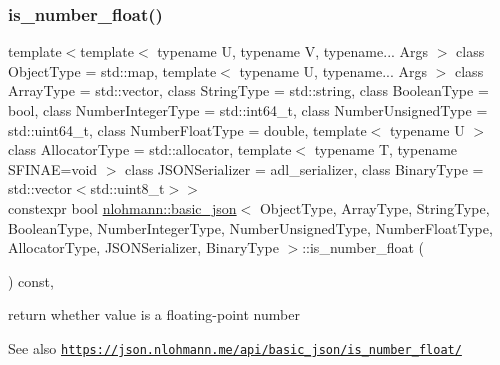 \subsubsection{\texorpdfstring{is\+\_\+number\+\_\+float()}{is\_number\_float()}}
{\footnotesize\ttfamily template$<$template$<$ typename U, typename V, typename... Args $>$ class Object\+Type = std\+::map, template$<$ typename U, typename... Args $>$ class Array\+Type = std\+::vector, class String\+Type  = std\+::string, class Boolean\+Type  = bool, class Number\+Integer\+Type  = std\+::int64\+\_\+t, class Number\+Unsigned\+Type  = std\+::uint64\+\_\+t, class Number\+Float\+Type  = double, template$<$ typename U $>$ class Allocator\+Type = std\+::allocator, template$<$ typename T, typename S\+F\+I\+N\+A\+E=void $>$ class J\+S\+O\+N\+Serializer = adl\+\_\+serializer, class Binary\+Type  = std\+::vector$<$std\+::uint8\+\_\+t$>$$>$ \\
constexpr bool \hyperlink{classnlohmann_1_1basic__json}{nlohmann\+::basic\+\_\+json}$<$ Object\+Type, Array\+Type, String\+Type, Boolean\+Type, Number\+Integer\+Type, Number\+Unsigned\+Type, Number\+Float\+Type, Allocator\+Type, J\+S\+O\+N\+Serializer, Binary\+Type $>$\+::is\+\_\+number\+\_\+float (\begin{DoxyParamCaption}{ }\end{DoxyParamCaption}) const\hspace{0.3cm}{\ttfamily [inline]}, {\ttfamily [noexcept]}}



return whether value is a floating-\/point number 

\begin{DoxySeeAlso}{See also}
\href{https://json.nlohmann.me/api/basic_json/is_number_float/}{\tt https\+://json.\+nlohmann.\+me/api/basic\+\_\+json/is\+\_\+number\+\_\+float/} 
\end{DoxySeeAlso}
\mbox{\label{classnlohmann_1_1basic__json_ac4b4acf2c0ad075c0dc125a65c102362}} 
